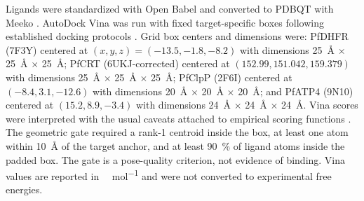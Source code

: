 \documentclass[journal=jcisd8,manuscript=article]{achemso}
\begin{document}
Ligands were standardized with Open Babel \cite{OBoyle2011} and converted to PDBQT with Meeko \cite{Eberhardt2021}. AutoDock Vina was run with fixed target-specific boxes following established docking protocols \cite{Trott2009}. Grid box centers and dimensions were: PfDHFR (7F3Y) centered at $(x,y,z) = (\num{-13.5}, \num{-1.8}, \num{-8.2})$ with dimensions \qty{25}{\angstrom} $\times$ \qty{25}{\angstrom} $\times$ \qty{25}{\angstrom}; PfCRT (6UKJ-corrected) centered at $(\num{152.99}, \num{151.042}, \num{159.379})$ with dimensions \qty{25}{\angstrom} $\times$ \qty{25}{\angstrom} $\times$ \qty{25}{\angstrom}; PfClpP (2F6I) centered at $(\num{-8.4}, \num{3.1}, \num{-12.6})$ with dimensions \qty{20}{\angstrom} $\times$ \qty{20}{\angstrom} $\times$ \qty{20}{\angstrom}; and PfATP4 (9N10) centered at $(\num{15.2}, \num{8.9}, \num{-3.4})$ with dimensions \qty{24}{\angstrom} $\times$ \qty{24}{\angstrom} $\times$ \qty{24}{\angstrom}. Vina scores were interpreted with the usual caveats attached to empirical scoring functions \cite{Quiroga2016}. The geometric gate required a rank-1 centroid inside the box, at least one atom within \qty{10}{\angstrom} of the target anchor, and at least \qty{90}{\percent} of ligand atoms inside the padded box. The gate is a pose-quality criterion, not evidence of binding. Vina values are reported in \si{\kilo\calorie\per\mole} and were not converted to experimental free energies.
\end{document}
